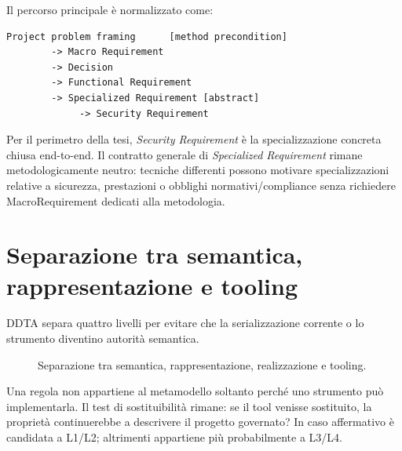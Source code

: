 \documentclass[12pt,a4paper,oneside]{report}
\newcommand{\sr}{\textit{Specialized Requirement}}
\newcommand{\secreq}{\textit{Security Requirement}}
\begin{document}
Il percorso principale è normalizzato come:
\begin{lstlisting}
Project problem framing      [method precondition]
        -> Macro Requirement
        -> Decision
        -> Functional Requirement
        -> Specialized Requirement [abstract]
             -> Security Requirement
\end{lstlisting}

Per il perimetro della tesi, \secreq{} è la specializzazione concreta chiusa end-to-end. Il contratto generale di \sr{} rimane metodologicamente neutro: tecniche differenti possono motivare specializzazioni relative a sicurezza, prestazioni o obblighi normativi/compliance senza richiedere MacroRequirement dedicati alla metodologia.

\section{Separazione tra semantica, rappresentazione e tooling}

DDTA separa quattro livelli per evitare che la serializzazione corrente o lo strumento diventino autorità semantica.

\begin{figure}[H]
\centering
{}
\caption{Separazione tra semantica, rappresentazione, realizzazione e tooling.}
\end{figure}

Una regola non appartiene al metamodello soltanto perché uno strumento può implementarla. Il test di sostituibilità rimane: se il tool venisse sostituito, la proprietà continuerebbe a descrivere il progetto governato? In caso affermativo è candidata a L1/L2; altrimenti appartiene più probabilmente a L3/L4.
\end{document}
